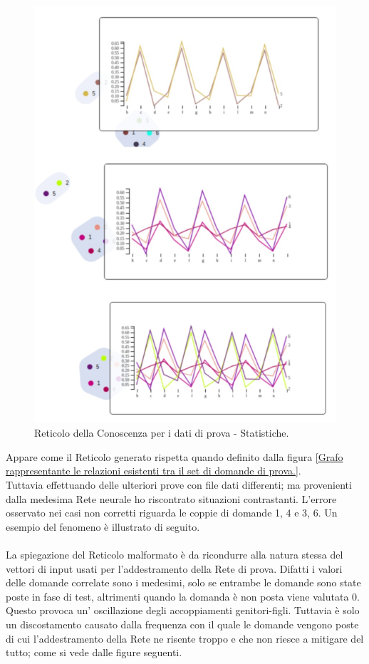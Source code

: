 \begin{figure}[H]
\centering
	\includegraphics[width=0.50\linewidth]{./image/collage_reticolo-general-statistic.png}
	\caption{Reticolo della Conoscenza per i dati di prova - Statistiche.}
	\label{Reticolo della Conoscenza per i dati di prova - Statistiche.}
\end{figure}
\noindent
Appare come il Reticolo generato rispetta quando definito dalla figura \ref{Grafo rappresentante le relazioni esistenti tra il set di domande di prova.}.\\
Tuttavia effettuando delle ulteriori prove con file dati differenti; ma provenienti dalla medesima Rete neurale ho riscontrato situazioni contrastanti. L'errore osservato nei casi non corretti riguarda le coppie di domande 1, 4 e 3, 6. Un esempio del fenomeno \`e illustrato di seguito.\\\\
\noindent
La spiegazione del Reticolo malformato \`e da ricondurre alla natura stessa del vettori di input usati per l'addestramento della Rete di prova. Difatti i valori delle domande correlate sono i medesimi, solo se entrambe le domande sono state poste in fase di test, altrimenti quando la domanda \`e non posta viene valutata 0. Questo provoca un' oscillazione degli accoppiamenti genitori-figli. Tuttavia \`e solo un discostamento causato dalla frequenza con il quale le domande vengono poste di cui l'addestramento della Rete ne risente troppo e che  non riesce a mitigare del tutto; come si vede dalle figure seguenti.

